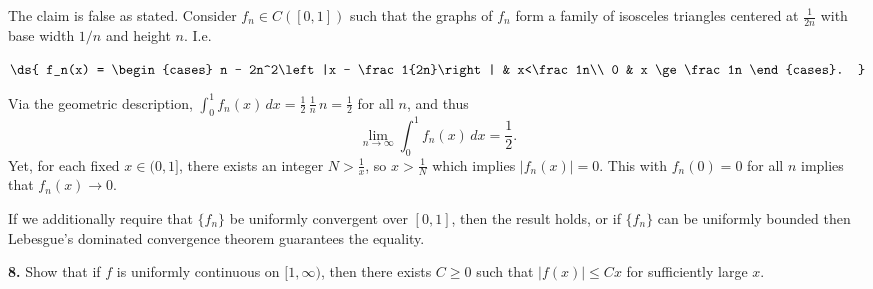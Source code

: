 \documentclass{homework}
\begin{document}
\begin{solution}
  The claim is false as stated.  Consider $f_n \in C([0,1])$ such that the graphs of $f_n$ form a family of isosceles triangles centered at $\frac 1{2n}$ with base width $1/n$ and height $n$.  I.e. 
  \begin{minipage}{.35\textwidth}
  \end{minipage}
  \begin{minipage}{.6\textwidth}
  $\ds{
    f_n(x) = \begin{cases}
    n - 2n^2\left |x - \frac 1{2n}\right| & x<\frac 1n\\
    0 & x \ge \frac 1n
    \end{cases}.
  }
  $
  \end{minipage}
  Via the geometric description, $\int_0^1 f_n(x)\,dx = \frac 12\,\frac 1n\, n
  = \frac 12$ for all $n$, and thus 
  $$\lim_{n\to \infty} \int_0^1 f_n(x)\,dx = \frac 12.$$ 
  Yet, for each fixed $x\in(0,1]$, there exists an integer $N >
  \frac 1x$, so $x > \frac 1N$ which implies $|f_n(x)| = 0$.  This with $f_n(0)
  = 0$ for all $n$ implies that $f_n(x) \to 0$.

  If we additionally require that $\{f_n\}$ be uniformly convergent over $[0,1]$, then the result holds, or if $\{f_n\}$ can be uniformly bounded then Lebesgue's dominated convergence theorem guarantees the equality.
\end{solution}

{\bf 8.} Show that if $f$ is uniformly continuous on $[1,\infty)$, then there exists $C\ge 0$ such that $|f(x)| \le Cx$ for sufficiently large $x$.  
\end{document}
